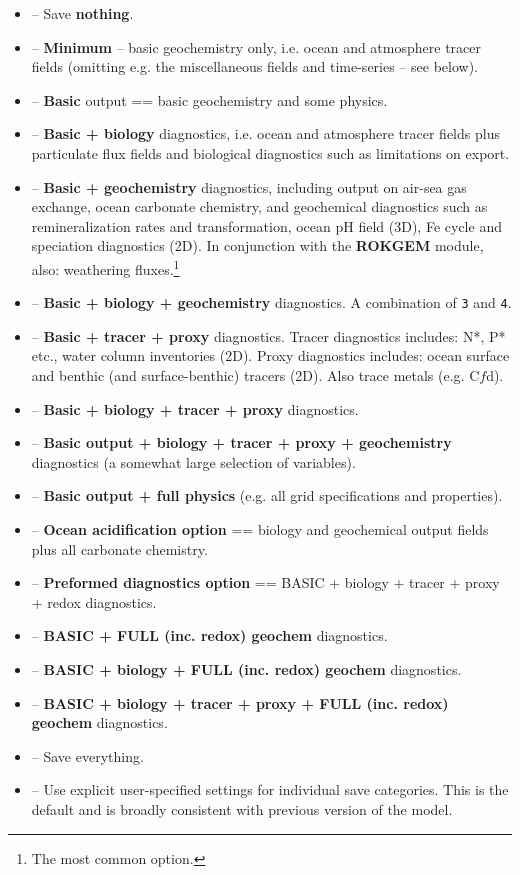 \documentclass[11pt,fleqn]{book} %
\begin{document}
\vspace{2mm}\begin{itemize}

\item[0] -- Save \textbf{nothing}.
\item[1] -- \textbf{Minimum} -- basic geochemistry only, i.e. ocean and atmosphere tracer fields (omitting e.g. the miscellaneous fields and time-series -- see below).
\item[2] -- \textbf{Basic} output == basic geochemistry and some physics.
\item[3] -- \textbf{Basic + biology} diagnostics, i.e. ocean and atmosphere tracer fields plus particulate  flux fields and biological diagnostics such as limitations on export.
\item[4] -- \textbf{Basic + geochemistry} diagnostics, including output on air-sea gas exchange, ocean carbonate chemistry, and geochemical diagnostics such as remineralization rates and transformation, ocean pH field (3D), Fe cycle and speciation diagnostics (2D). In conjunction with the \textbf{ROKGEM} module, also: weathering fluxes.\footnote{The most common option.} \item[5] -- \textbf{Basic + biology + geochemistry} diagnostics. A combination of \texttt{3} and \texttt{4}.
\item[6] -- \textbf{Basic + tracer + proxy} diagnostics. Tracer diagnostics includes: N*, P* etc., water column inventories (2D). Proxy diagnostics includes: ocean surface and benthic (and surface-benthic) tracers (2D). Also trace metals (e.g. C\(f\)d).\item[7] -- \textbf{Basic + biology + tracer + proxy} diagnostics. 
\item[8] -- \textbf{Basic output + biology + tracer + proxy + geochemistry} diagnostics (a somewhat large selection of variables).
\item[9] -- \textbf{Basic output + full physics} (e.g. all grid specifications and properties).
\item[10] -- \textbf{Ocean acidification option} == biology and geochemical output fields plus all carbonate chemistry.
\item[11] -- \textbf{Preformed diagnostics option} == BASIC + biology + tracer + proxy + redox diagnostics.
\item[14] -- \textbf{ BASIC + FULL (inc. redox) geochem} diagnostics.
\item[15] -- \textbf{ BASIC + biology + FULL (inc. redox) geochem} diagnostics.
\item[17] -- \textbf{ BASIC + biology + tracer + proxy + FULL (inc. redox) geochem} diagnostics.
\item[99] -- Save everything.
\item[>99] -- Use explicit user-specified settings for individual save categories. This is the default and is broadly consistent with previous version of the model.

\end{itemize}\vspace{2mm}
\end{document}

